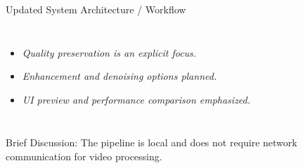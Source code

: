 \documentclass[aspectratio=169,11pt]{beamer}
\newcommand{\smallnote}[1]{%
\vspace{0.08cm}
{\scriptsize\color{GEUGrey}#1}
}
\newcommand{\placeholder}[1]{%
\textit{\color{GEUGrey}#1}
}
\begin{document}
\begin{frame}{Updated System Architecture / Workflow}
\begin{columns}[T,totalwidth=\textwidth]
\begin{itemize}\itemsep-2pt
\item \placeholder{Quality preservation is an explicit focus.}
\item \placeholder{Enhancement and denoising options planned.}
\item \placeholder{UI preview and performance comparison emphasized.}
\end{itemize}

\end{columns}

\vfill

\smallnote{
Brief Discussion: The pipeline is local and does not require network communication for video processing.
}

\end{frame}
\end{document}
